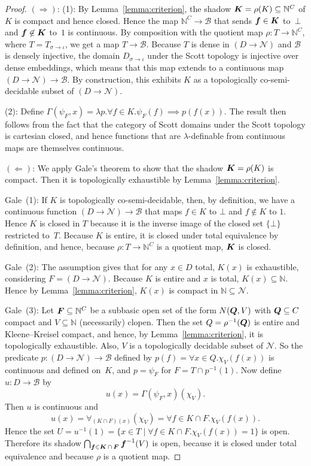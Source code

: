 \documentclass{LMCS}
\newcommand{\N}{\mathbb{N}}
\newcommand{\pN}{\mathcal{N}}
\newcommand{\pBool}{\mathcal{B}}
\newcommand{\True}{1}\newcommand{\False}{0}\newcommand{\domain}[1]{{\D_{#1}}}
\newcommand{\D}{D}
\newcommand{\C}{C}
\newcommand{\f}{\operatorname{\text{\boldmath{$f$}}}}
\newcommand{\sK}{\operatorname{\text{\boldmath{$K$}}}}
\newcommand{\sF}{\operatorname{\text{\boldmath{$F$}}}}
\newcommand{\sQ}{\operatorname{\text{\boldmath{$Q$}}}}
\begin{document}
\begin{proof}
  $(\Rightarrow)$: (1): By Lemma~\ref{lemma:criterion}, the shadow
  $\sK=\rho(K) \subseteq \N^\C$ of $K$ is compact and hence closed.
  Hence the map $\N^\C \to \pBool$ that sends $\f \in \sK$ to~$\bot$
  and $\f \not\in \sK$ to~$\True$ is continuous. By composition with
  the quotient map $\rho \colon T \to \N^C$, where $T=T_{\sigma \to
    \iota}$, we get a map $T \to \pBool$. Because $T$ is dense in $(D
  \to \pN)$ and $\pBool$ is densely injective, the domain
  $D_{\sigma\to\iota}$ under the Scott topology is injective over
  dense embeddings, which means that this map extends to a continuous
  map $(D \to \pN) \to \pBool$.  By construction, this exhibits $K$ as
  a topologically co-semi-decidable subset of $(D \to \pN)$.

  (2): Define $\Gamma(\psi_F,x) = \lambda p.\forall {f \in K}.
  \psi_F(f) \implies p(f(x))$. 
  The result then follows from the fact that the category of Scott
  domains under the Scott topology is cartesian closed, and hence
  functions that are $\lambda$-definable from continuous maps are
  themselves continuous. 

  $(\Leftarrow)$: We apply Gale's theorem to show that the shadow
  $\sK=\rho(K)$ is compact. Then it is topologically exhaustible by
  Lemma~\ref{lemma:criterion}. 

  Gale~(1): If $K$ is topologically co-semi-decidable, then, by
  definition, we have a continuous function $(D \to \pN) \to \pBool$
  that maps $f \in K$ to $\bot$ and $f \not\in K$ to $\True$.  Hence
  $K$ is closed in $T$ because it is the inverse image of the closed
  set $\{\bot\}$ restricted to~$T$.  Because $K$ is entire, it is
  closed under total equivalence by definition, and hence, because
  $\rho \colon T \to \N^C$ is a quotient map, $\sK$ is closed.

  Gale~(2): The assumption gives that for any $x \in D$ total, $K(x)$
  is exhaustible, considering $F=(D \to \pN)$. Because $K$ is entire
  and $x$ is total, $K(x) \subseteq \N$. Hence by
  Lemma~\ref{lemma:criterion}, $K(x)$ is compact in $\N \subseteq
  \pN$.

  \pagebreak[3] Gale~(3): Let $\sF \subseteq \N^C$ be a subbasic open
  set of the form $N(\sQ,V)$ with $\sQ \subseteq C$ compact and $V
  \subseteq \N$ (necessarily) clopen. Then the set $Q=\rho^{-1}(\sQ)$
  is entire and Kleene--Kreisel compact, and hence, by
  Lemma~\ref{lemma:criterion}, it is topologically exhaustible. Also,
  $V$ is a topologically decidable subset of $\pN$. So the predicate
  $p \colon (D \to \pN) \to \pBool$ defined by $p(f) = \forall x \in
  Q. \chi_V(f(x))$ is continuous and defined on~$K$, and $p=\psi_F$
  for $F = T \cap p^{-1}(\True)$.  Now define $u \colon D
  \to \pBool$ by \[ u(x) = \Gamma(\psi_F,x)(\chi_V). \] Then
  $u$ is continuous and
  \[
  u(x) =  \forall_{(K\cap F)(x)}(\chi_V) 
  = \forall f \in K \cap F.\chi_V(f(x)).
  \]
  Hence the set $U = u^{-1}(\True) = \{ x \in T \mid \forall f \in K
  \cap F.\chi_V(f(x)) =\True \}$ is open. Therefore
  its shadow $\bigcap_{\f \in \sK \cap \sF} \f^{-1}(V)$ is open,
  because it is closed under total equivalence and because $\rho$ is a
  quotient map. \end{proof}
\end{document}

